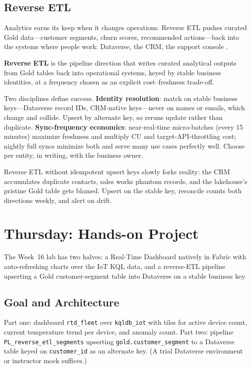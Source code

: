 \subsection{Reverse ETL}
Analytics earns its keep when it changes operations. Reverse ETL pushes curated Gold data---customer segments, churn scores, recommended actions---back into the systems where people work: Dataverse, the CRM, the support console \cite{microsoftFabricPipelines}.

\begin{definitionbox}
\textbf{Reverse ETL} is the pipeline direction that writes curated analytical outputs from Gold tables back into operational systems, keyed by stable business identities, at a frequency chosen as an explicit cost--freshness trade-off.
\end{definitionbox}

Two disciplines define success. \textbf{Identity resolution}: match on stable business keys---Dataverse record IDs, CRM-native keys---never on names or emails, which change and collide. Upsert by alternate key, so reruns update rather than duplicate. \textbf{Sync-frequency economics}: near-real-time micro-batches (every 15 minutes) maximize freshness and multiply CU and target-API-throttling cost; nightly full syncs minimize both and serve many use cases perfectly well. Choose per entity, in writing, with the business owner.

\begin{pitfall}
Reverse ETL without idempotent upsert keys slowly forks reality: the CRM accumulates duplicate contacts, sales works phantom records, and the lakehouse's pristine Gold table gets blamed. Upsert on the stable key, reconcile counts both directions weekly, and alert on drift.
\end{pitfall}

\section{Thursday: Hands-on Project}
The Week~16 lab has two halves: a Real-Time Dashboard natively in Fabric with auto-refreshing charts over the IoT KQL data, and a reverse-ETL pipeline upserting a Gold customer-segment table into Dataverse on a stable business key.

\subsection{Goal and Architecture}
Part one: dashboard \texttt{rtd\_fleet} over \texttt{kqldb\_iot} with tiles for active device count, current temperature trend per device, and anomaly count. Part two: pipeline \texttt{PL\_reverse\_etl\_segments} upserting \texttt{gold.customer\_segment} to a Dataverse table keyed on \texttt{customer\_id} as an alternate key. (A trial Dataverse environment or instructor mock suffices.)

